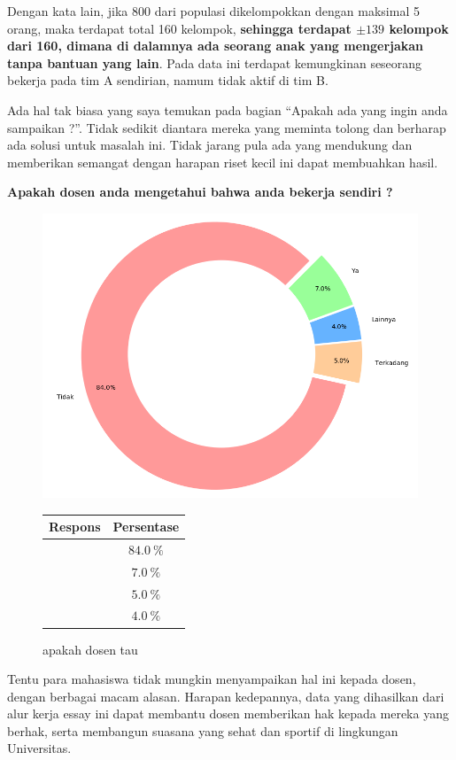 \documentclass[a4paper,11pt]{article}
\begin{document}
Dengan kata lain, jika 800 dari populasi dikelompokkan dengan maksimal
5 orang, maka terdapat total 160 kelompok, \textbf{sehingga terdapat
$\pm 139$ kelompok dari 160, dimana di dalamnya ada seorang anak yang
mengerjakan tanpa bantuan yang lain}. Pada data ini terdapat
kemungkinan seseorang bekerja pada tim A sendirian, namum tidak aktif
di tim B.

Ada hal tak biasa yang saya temukan pada bagian ``Apakah ada yang
ingin anda sampaikan ?''. Tidak sedikit diantara mereka yang meminta
tolong dan berharap ada solusi untuk masalah ini. Tidak jarang
pula ada yang mendukung dan memberikan semangat dengan harapan riset
kecil ini dapat membuahkan hasil.

\begin{center}
  \textbf{\small Apakah dosen anda mengetahui bahwa anda bekerja sendiri ?}
\end{center}

\begin{figure}[!ht]
  \centering
  \includegraphics[width=.4\linewidth]{img/dosen-tau-2.png}
  \qquad
  \begin{tabular}[b]{cc}\hline
    Respons & Persentase \\ \hline
    \color{red-1}{Tidak} & $\SI{84.0}{\percent}$ \\
    \color{green-1}{Ya} & $\SI{7.0}{\percent}$  \\
    \color{orange-1}{Terkadang} & $\SI{5.0}{\percent}$ \\
    \color{blue-1}{Lainnya} & $\SI{4.0}{\percent}$ \\ \hline
  \end{tabular}
  \captionsetup{labelformat=andtable}
  \caption{apakah dosen tau}
\end{figure}


Tentu para mahasiswa tidak mungkin menyampaikan hal ini kepada dosen,
dengan berbagai macam alasan. Harapan kedepannya, data yang dihasilkan
dari alur kerja essay ini dapat membantu dosen memberikan hak kepada
mereka yang berhak, serta membangun suasana yang sehat dan sportif di
lingkungan Universitas.
\end{document}
